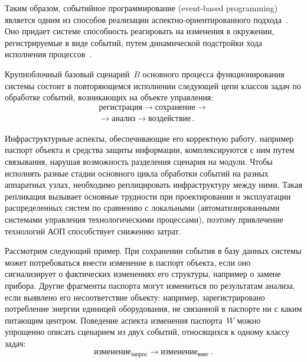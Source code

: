\begin{multicols}{2}
Таким образом, событийное программирование 
(event-based programming) является одним из способов реализации 
   ас\-пект\-но-ори\-ен\-ти\-ро\-ван\-но\-го подхода~\cite{20-kov}. Оно придает 
системе способность реагировать на изменения в окружении, регистрируемые в 
виде событий, путем динамической подстройки хода исполнения 
процессов~\cite{26-kov}.
   
   Крупноблочный базовый сценарий~$B$ основного процесса 
функционирования системы состоит в повторяющемся исполнении следующей 
цепи классов задач по обработке событий, возникающих на объекте 
управления:
   \begin{multline*}
    \mbox{регистрация}\rightarrow   \mbox{сохранение} 
    \rightarrow  {}\\
{}    \rightarrow\mbox{анализ} \rightarrow   \mbox{воздействие}\,.
   \end{multline*}

   Инфраструктурные аспекты, обеспечивающие его корректную работу, 
например паспорт объекта и средства защиты информации, комплексируются с 
ним путем связывания, нарушая возможность разделения сценария на модули. 
Чтобы исполнять разные стадии основного цикла обработки событий на разных 
аппаратных узлах, необходимо реплицировать инфраструктуру между ними. 
Такая репликация вызывает основные трудности при проектировании и 
эксплуатации распределенных систем по сравнению с локальными (автоматизированными
сис\-те\-ма\-ми управ\-ле\-ния технологическими процессами), 
поэтому привлечение технологий АОП способствует снижению затрат. 

Рассмотрим следующий пример. При сохранении события в базу данных 
системы может потребоваться внести изменение в паспорт объекта, если оно 
сигнализирует о фактических изменениях его структуры, например о замене 
прибора. Другие фрагменты паспорта могут измениться по результатам 
анализа, если выявлено его несоответствие объекту: например, 
зарегистрировано потребление энергии единицей оборудования, не связанной в 
паспорте ни с каким питающим центром. Поведение аспекта изменения 
паспорта~$W$ можно упрощенно описать сценарием из двух событий, 
относящихся к одному классу задач:
$$
    \mbox{изменение}_{\mathrm{запрос}}\rightarrow   \mbox{изменение}_{\mathrm{внес}}\,.
    $$


\end{multicols}
